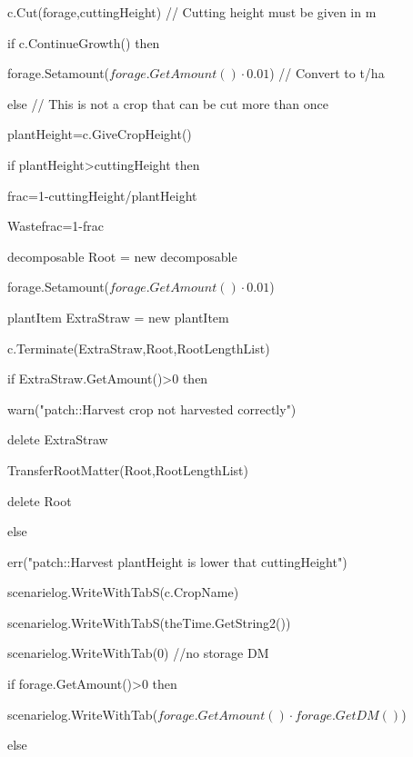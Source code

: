 \documentclass[%
]{scrartcl}
\begin{document}
{{{      \quad      c.Cut(forage,cuttingHeight)
          // Cutting height must be given in m

     \quad       if c.ContinueGrowth() then

       \quad\quad         forage.Setamount($forage.GetAmount() \cdot 0.01$)      // Convert to t/ha

            else            
   // This is not a crop that can be cut more than once
            
            	  plantHeight=c.GiveCropHeight()
           
 	if plantHeight>cuttingHeight then
            	
            	 \quad	  frac=1-cuttingHeight/plantHeight
            	 
\quad	Wastefrac=1-frac
            	 
\quad	decomposable  Root = new decomposable
           
  \quad		 forage.Setamount($forage.GetAmount() \cdot 0.01$)
            	
 \quad	plantItem  ExtraStraw = new plantItem
            
 \quad		  
            	 
\quad	 c.Terminate(ExtraStraw,Root,RootLengthList)
            
 \quad		if ExtraStraw.GetAmount()>0 then
          
   \quad \quad			warn("patch::Harvest crop not harvested correctly")
            
 \quad		delete ExtraStraw
            	
 \quad	 TransferRootMatter(Root,RootLengthList)
            
 \quad		delete Root
            	
            	else
            	
            	 \quad	err("patch::Harvest plantHeight is lower that cuttingHeight")
            	

           
         	scenarielog.WriteWithTabS(c.CropName)
         	
 scenarielog.WriteWithTabS(theTime.GetString2())
         	
scenarielog.WriteWithTab(0)   //no storage DM
           
 if forage.GetAmount()>0 then
        	 		
  \quad scenarielog.WriteWithTab($forage.GetAmount() \cdot forage.GetDM()$)
         	
else
        	 	
}}}
\end{document}
